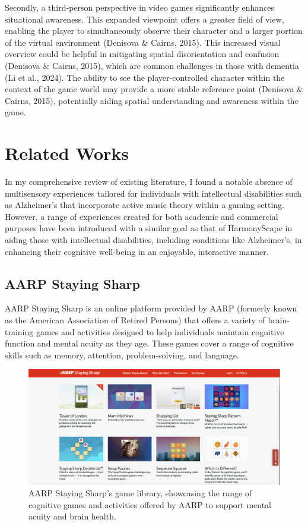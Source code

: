 \documentclass{l4proj}
\begin{document}
Secondly, a third-person perspective in video games significantly enhances situational awareness. This expanded viewpoint offers a greater field of view, enabling the player to simultaneously observe their character and a larger portion of the virtual environment (Denisova \& Cairns, 2015). This increased visual overview could be helpful in mitigating spatial disorientation and confusion (Denisova \& Cairns, 2015), which are common challenges in those with dementia (Li et al., 2024). The ability to see the player-controlled character within the context of the game world may provide a more stable reference point (Denisova \& Cairns, 2015), potentially aiding spatial understanding and awareness within the game.


\section{Related Works}
In my comprehensive review of existing literature, I found a notable absence of multisensory experiences tailored for individuals with intellectual disabilities such as Alzheimer’s that incorporate active music theory within a gaming setting. However, a range of experiences created for both academic and commercial purposes have been introduced with a similar goal as that of HarmonyScape in aiding those with intellectual disabilities, including conditions like Alzheimer’s, in enhancing their cognitive well-being in an enjoyable, interactive manner.

\subsection{AARP Staying Sharp}
AARP Staying Sharp is an online platform provided by AARP (formerly known as the American Association of Retired Persons) that offers a variety of brain-training games and activities designed to help individuals maintain cognitive function and mental acuity as they age. These games cover a range of cognitive skills such as memory, attention, problem-solving, and language.

\begin{figure}[h]
    \centering
    \includegraphics[width=0.8\linewidth]{images/AARP_Staying_Sharp.png}    

    \caption{AARP Staying Sharp's game library, showcasing the range of cognitive games and activities offered by AARP to support mental acuity and brain health.
    }

    \label{fig:aarp} 
\end{figure}
\end{document}
